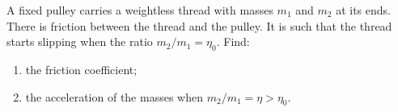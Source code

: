 \item A fixed pulley carries a weightless thread with masses $m_{1}$ and $m_{2}$ at its ends. There is friction between the thread and the pulley. It is such that the thread starts slipping when the ratio $m_{2}/m_{1} = \eta_{0}$. Find:
    \begin{enumerate}
        \item the friction coefficient;
        \item the acceleration of the masses when $m_{2}/m_{1} = \eta > \eta_{0}$.
    \end{enumerate}